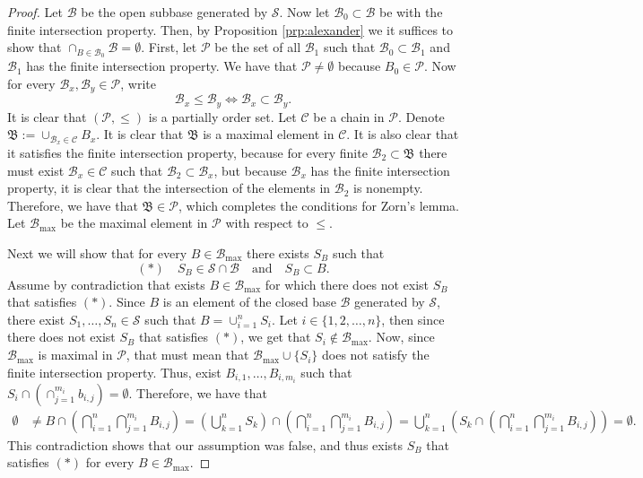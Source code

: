 \documentclass[11pt,a4paper]{article}
\theoremstyle{definition}
\theoremstyle{plain}
\newcommand{\tand}{\quad \text{and} \quad}
\begin{document}
  \begin{proof}
    Let $\mathcal B$ be the open subbase generated by $\mathcal S$.
    Now let $\mathcal B_0 \subset \mathcal B$ be with the finite intersection
    property. Then, by Proposition \ref{prp:alexander} we it suffices to
    show that $\cap_{B \in \mathcal B_0} \mathcal B = \emptyset$.
    First, let $\mathcal P$ be the set of all $\mathcal B_1$ such that
    $\mathcal B_0 \subset \mathcal B_1$ and $\mathcal B_1$ has the finite
    intersection property. We have that $\mathcal P \neq \emptyset$ because
    $B_0 \in \mathcal P$. Now for every 
    $\mathcal B_x, \mathcal B_y \in \mathcal P$, write
    \[
      \mathcal B_x \le \mathcal B_y \iff
      \mathcal B_x \subset \mathcal B_y.
    \]
    It is clear that $(\mathcal P, \le)$ is a partially order set.
    Let $\mathcal C$ be a chain in $\mathcal P$.
    Denote $\mathfrak B := \cup_{\mathcal B_x \in \mathcal C} B_x$.
    It is clear that $\mathfrak B$ is a maximal element in $\mathcal C$.
    It is also clear that it satisfies the finite intersection property,
    because for every finite $\mathcal B_2 \subset \mathfrak B$ there
    must exist $\mathcal B_x \in \mathcal C$ such that 
    $\mathcal B_2 \subset \mathcal B_x$, but because $\mathcal B_x$ has
    the finite intersection property, it is clear that the intersection
    of the elements in $\mathcal B_2$ is nonempty.
    Therefore, we have that $\mathfrak B \in \mathcal P$, which completes
    the conditions for Zorn's lemma.
    Let $\mathcal B_{\max}$ be the maximal element in $\mathcal P$ with
    respect to $\le$.

    Next we will show that for every $B \in \mathcal B_{\max}$ there exists
    $S_B$ such that
    \[
      (*) \quad S_B \in \mathcal S \cap \mathcal B \tand S_B \subset B.
    \]
    Assume by contradiction that exists $B \in \mathcal B_{\max}$ for which
    there does not exist $S_B$ that satisfies $(*)$. Since $B$ is an element
    of the closed base $\mathcal B$ generated by $\mathcal S$, there exist
    $S_1,\dots,S_n \in \mathcal S$ such that $B = \cup_{i=1}^{n} S_i$.
    Let $i \in \{1,2,\dots,n\}$, then since there does not exist $S_B$ that 
    satisfies $(*)$, we get that $S_i \notin \mathcal B_{\max}$.
    Now, since $\mathcal B_{\max}$ is maximal in $\mathcal P$, that must
    mean that $\mathcal B_{\max} \cup \{S_i\}$ does not satisfy the finite
    intersection property.
    Thus, exist $B_{i,1},\dots,B_{i,m_i}$ such that
    $S_i \cap \left(\cap_{j=1}^{m_i} b_{i,j}\right) = \emptyset$.
    Therefore, we have that
    \begin{align*}
      \emptyset 
      &\neq
      B \cap \left(\bigcap_{i=1}^{n} \bigcap_{j=1}^{m_i} B_{i,j}\right) =
      \left(\bigcup_{k=1}^{n} S_k\right) \cap
         \left(\bigcap_{i=1}^{n} \bigcap_{j=1}^{m_i} B_{i,j}\right) =
      \bigcup_{k=1}^{n} 
      \left(S_k \cap 
      \left(\bigcap_{i=1}^{n} \bigcap_{j=1}^{m_i} B_{i,j}\right)\right)
      = \emptyset.
    \end{align*}
    This contradiction shows that our assumption was false, and thus
    exists $S_B$ that satisfies $(*)$ for every $B \in \mathcal B_{\max}$.


\end{proof}
\end{document}
